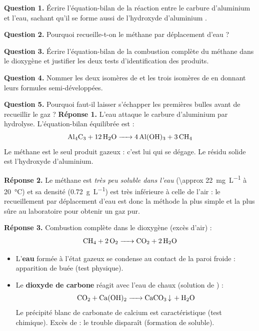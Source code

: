 \documentclass[11pt]{article}
\begin{document}
\begin{exoresolu}
\textbf{Question 1.} Écrire l'équation-bilan de la réaction entre le carbure d'aluminium et l'eau, sachant qu'il se forme aussi de l'hydroxyde d'aluminium .

\textbf{Question 2.} Pourquoi recueille-t-on le méthane par déplacement d'eau ?

\textbf{Question 3.} Écrire l'équation-bilan de la combustion complète du méthane dans le dioxygène et justifier les deux tests d'identification des produits.

\textbf{Question 4.} Nommer les deux isomères de  et les trois isomères de  en donnant leurs formules semi-développées.

\textbf{Question 5.} Pourquoi faut-il laisser s'échapper les premières bulles avant de recueillir le gaz ?
\tcblower
\textbf{Réponse 1.} L'eau attaque le carbure d'aluminium par hydrolyse. L'équation-bilan équilibrée est :
\[ \ce{Al4C3 + 12 H2O -> 4 Al(OH)3 + 3 CH4} \]
Le méthane est le seul produit gazeux : c'est lui qui se dégage. Le résidu solide est l'hydroxyde d'aluminium.

\textbf{Réponse 2.} Le méthane est \emph{très peu soluble dans l'eau} (\SI{\approx 22}{mg.L^{-1}} à \SI{20}{\celsius}) et sa densité (\SI{0,72}{g.L^{-1}}) est très inférieure à celle de l'air : le recueillement par déplacement d'eau est donc la méthode la plus simple et la plus sûre au laboratoire pour obtenir un gaz pur.

\textbf{Réponse 3.} Combustion complète dans le dioxygène (excès d'air) :
\[ \ce{CH4 + 2 O2 -> CO2 + 2 H2O} \]
\begin{itemize}
\item L'\textbf{eau} formée à l'état gazeux se condense au contact de la paroi froide : apparition de buée (test physique).
\item Le \textbf{dioxyde de carbone} réagit avec l'eau de chaux (solution de ) :
\[ \ce{CO2 + Ca(OH)2 -> CaCO3 v + H2O} \]
Le précipité blanc de carbonate de calcium  est caractéristique (test chimique). Excès de  : le trouble disparaît (formation de  soluble).
\end{itemize}


\end{exoresolu}
\end{document}
